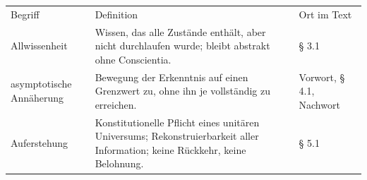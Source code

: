 \documentclass[
  ngerman,
]{article}
\begin{document}
\begin{longtable}[]{@{}
  >{\raggedright\arraybackslash}p{}
  >{\raggedright\arraybackslash}p{}
  >{\raggedright\arraybackslash}p{}@{}}
\toprule\noalign{}
\begin{minipage}[b]{\linewidth}\raggedright
Begriff
\end{minipage} & \begin{minipage}[b]{\linewidth}\raggedright
Definition
\end{minipage} & \begin{minipage}[b]{\linewidth}\raggedright
Ort im Text
\end{minipage} \\
\begin{minipage}[b]{\linewidth}\raggedright
Allwissenheit
\end{minipage} & \begin{minipage}[b]{\linewidth}\raggedright
Wissen, das alle Zustände enthält, aber nicht durchlaufen wurde; bleibt
abstrakt ohne Conscientia.
\end{minipage} & \begin{minipage}[b]{\linewidth}\raggedright
§ 3.1
\end{minipage} \\
\begin{minipage}[b]{\linewidth}\raggedright
asymptotische Annäherung
\end{minipage} & \begin{minipage}[b]{\linewidth}\raggedright
Bewegung der Erkenntnis auf einen Grenzwert zu, ohne ihn je vollständig
zu erreichen.
\end{minipage} & \begin{minipage}[b]{\linewidth}\raggedright
Vorwort, § 4.1, Nachwort
\end{minipage} \\
\begin{minipage}[b]{\linewidth}\raggedright
Auferstehung
\end{minipage} & \begin{minipage}[b]{\linewidth}\raggedright
Konstitutionelle Pflicht eines unitären Universums; Rekonstruierbarkeit
aller Information; keine Rückkehr, keine Belohnung.
\end{minipage} & \begin{minipage}[b]{\linewidth}\raggedright
§ 5.1
\end{minipage} \\

\end{longtable}
\end{document}
